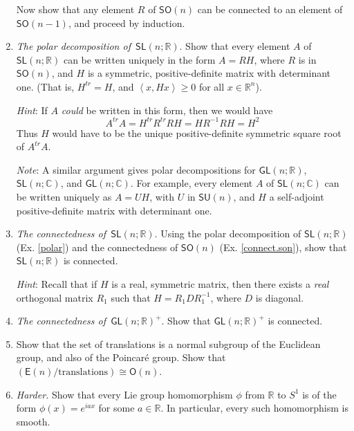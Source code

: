 \documentclass{amsbook}
\theoremstyle{plain}
\numberwithin{equation}{chapter}
\numberwithin{theorem}{chapter}
\begin{document}
\begin{enumerate}
Now show that any element $R$ of $\mathsf{SO}(n)$ can be connected to an
element of $\mathsf{SO}(n-1)$, and proceed by induction.

\item \label{polar}\textit{The polar decomposition of}\emph{\ }$\mathsf{SL}%
\left(  n;\mathbb{R}\right)  $. Show that every element $A$ of $\mathsf{SL}%
\left(  n;\mathbb{R}\right)  $ can be written uniquely in the form $A=RH$,
where $R$ is in $\mathsf{SO}(n)$, and $H$ is a symmetric, positive-definite
matrix with determinant one. (That is, $H^{tr}=H$, and $\left\langle
x,Hx\right\rangle \geq0$ for all $x\in\mathbb{R}^{n}$).

\textit{Hint}: If $A$ \textit{could} be written in this form, then we would
have
\[
A^{tr}A=H^{tr}R^{tr}RH=HR^{-1}RH=H^{2}%
\]
Thus $H$ would have to be the unique positive-definite symmetric square root
of $A^{tr}A$.

\textit{Note}: A similar argument gives polar decompositions for
$\mathsf{GL}(n;\mathbb{R})$, $\mathsf{SL}\left(  n;\mathbb{C}\right)  $, and
$\mathsf{GL}(n;\mathbb{C})$. For example, every element $A$ of $\mathsf{SL}%
\left(  n;\mathbb{C}\right)  $ can be written uniquely as $A=UH$, with $U$ in
$\mathsf{SU}(n)$, and $H$ a self-adjoint positive-definite matrix with
determinant one.

\item \label{connect.sln}\textit{The connectedness of}\emph{\ }$\mathsf{SL}%
\left(  n;\mathbb{R}\right)  $. Using the polar decomposition of
$\mathsf{SL}\left(  n;\mathbb{R}\right)  $ (Ex. \ref{polar}) and the
connectedness of $\mathsf{SO}(n)$ (Ex. \ref{connect.son}), show that
$\mathsf{SL}\left(  n;\mathbb{R}\right)  $ is connected.

\textit{Hint}: Recall that if $H$ is a real, symmetric matrix, then there
exists a \textit{real} orthogonal matrix $R_{1}$ such that $H=R_{1}DR_{1}%
^{-1}$, where $D$ is diagonal.

\item \label{connect.gln}\textit{The connectedness of}\emph{\ }$\mathsf{GL}%
(n;\mathbb{R})^{+}$. Show that $\mathsf{GL}(n;\mathbb{R})^{+}$ is connected.

\item  Show that the set of translations is a normal subgroup of the Euclidean
group, and also of the Poincar\'{e} group. Show that $\left(  \mathsf{E}%
(n)/\mathrm{translations}\right)  \cong\mathsf{O}(n)$.

\item \label{character}\textit{Harder. }Show that every Lie group homomorphism
$\phi$ from $\mathbb{R}$ to $S^{1}$ is of the form $\phi(x)=e^{iax}$ for some
$a\in\mathbb{R}$. In particular, every such homomorphism is smooth.
\end{enumerate}
\end{document}
